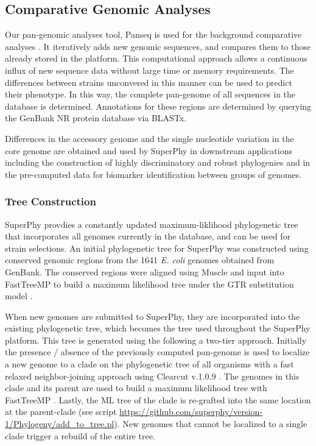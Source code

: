 \documentclass[doublespacing, linenumbers]{bmcart}
\begin{document}
\subsection{Comparative Genomic Analyses}
Our pan-genomic analyses tool, Panseq is used for the background comparative analyses \cite{laing_pan-genome_2010}. It iteratively adds new genomic sequences, and compares them to those already stored in the platform. This computational approach allows a continuous influx of new sequence data without large time or memory requirements. The differences between strains unconvered in this manner can be used to predict their phenotype. In this way, the complete pan-genome of all sequences in the database is determined. Annotations for these regions are determined by querying the GenBank NR protein database via BLASTx.

Differences in the accessory genome and the single nucleotide variation in the core genome are obtained and used by SuperPhy in downstream applications including the construction of highly discriminatory and robust phylogenies and in the pre-computed data for biomarker identification between groups of genomes.

\subsubsection{Tree Construction}
SuperPhy provdies a constantly updated maximum-liklihood phylogenetic tree that incorporates all genomes currently in the database, and can be used for strain selections. An initial phylogenetic tree for SuperPhy was constructed using conserved genomic regions from the 1641 \textit{E. coli} genomes obtained from GenBank. The conserved regions were aligned using Muscle \cite{edgar_muscle_2004,edgar_muscle_2004a} and input into FastTreeMP to build a maximum likelihood tree under the GTR substitution model \cite{price_fasttree_2010}.

When new genomes are submitted to SuperPhy, they are incorporated into the existing phylogenetic tree, which becomes the tree used throughout the SuperPhy platform. This tree is generated using the following a two-tier approach. Initially the presence / absence of the previously computed pan-genome is used to localize a new genome to a clade on the phylogenetic tree of all organisms with a fast relaxed neighbor-joining approach using Clearcut v.1.0.9 \cite{sheneman_clearcut:_2006}. The genomes in this clade and its parent are used to build a maximum likelihood tree with FastTreeMP \cite{price_fasttree_2010}. Lastly, the ML tree of the clade is re-grafted into the same location at the parent-clade (see script \url{https://github.com/superphy/version-1/Phylogeny/add_to_tree.pl}). New genomes that cannot be localized to a single clade trigger a rebuild of the entire tree.
\end{document}

